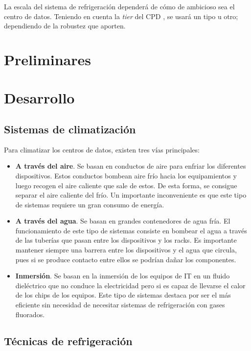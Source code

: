 La escala del sistema de refrigeración dependerá de cómo de ambicioso sea el centro de datos. Teniendo en cuenta la \textit{tier} del CPD \cite{cofrico}, se usará un tipo u otro; dependiendo de la robustez que aporten.

\chapter{Preliminares}

\chapter{Desarrollo}

\section{Sistemas de climatización}

Para climatizar los centros de datos, existen tres vías principales:

\begin{itemize}
    \item \textbf{A través del aire}. Se basan en conductos de aire para enfriar los diferentes dispositivos. Estos conductos bombean aire frío hacia los equipamientos y luego recogen el aire caliente que sale de estos. De esta forma, se consigue separar el aire caliente del frío. Un importante inconveniente es que este tipo de sistemas requiere un gran consumo de energía.
    \item \textbf{A través del agua}. Se basan en grandes contenedores de agua fría. El funcionamiento de este tipo de sistemas consiste en bombear el agua a través de las tuberías que pasan entre los dispositivos y los racks. Es importante mantener siempre una barrera entre los dispositivos y el agua que circula, pues si se produce contacto entre ellos se podrían dañar los componentes.
    \item \textbf{Inmersión}. Se basan en la inmersión de los equipos de IT en un fluido dieléctrico que no conduce la electricidad pero si es capaz de llevarse el calor de los chips de los equipos. Este tipo de sistemas destaca por ser el más eficiente sin necesidad de necesitar sistemas de refrigeración con gases fluorados.
\end{itemize}

\section{Técnicas de refrigeración}

